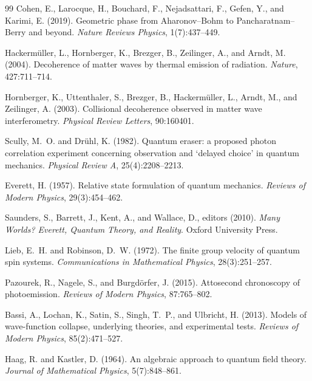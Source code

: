 \documentclass[11pt,a4paper]{article}
\theoremstyle{plain}
\theoremstyle{definition}
\theoremstyle{remark}
\begin{document}
\begin{thebibliography}{99}
Cohen, E., Larocque, H., Bouchard, F., Nejadsattari, F., Gefen, Y., and
  Karimi, E. (2019).
\newblock Geometric phase from Aharonov--Bohm to Pancharatnam--Berry and beyond.
\newblock \emph{Nature Reviews Physics}, 1(7):437--449.

Hackerm\"{u}ller, L., Hornberger, K., Brezger, B., Zeilinger, A., and Arndt, M.
  (2004).
\newblock Decoherence of matter waves by thermal emission of radiation.
\newblock \emph{Nature}, 427:711--714.

Hornberger, K., Uttenthaler, S., Brezger, B., Hackerm\"{u}ller, L., Arndt, M.,
  and Zeilinger, A. (2003).
\newblock Collisional decoherence observed in matter wave interferometry.
\newblock \emph{Physical Review Letters}, 90:160401.

Scully, M.~O. and Dr\"{u}hl, K. (1982).
\newblock Quantum eraser: a proposed photon correlation experiment concerning
  observation and `delayed choice' in quantum mechanics.
\newblock \emph{Physical Review A}, 25(4):2208--2213.

Everett, H. (1957).
\newblock Relative state formulation of quantum mechanics.
\newblock \emph{Reviews of Modern Physics}, 29(3):454--462.

Saunders, S., Barrett, J., Kent, A., and Wallace, D., editors (2010).
\newblock \emph{Many Worlds? Everett, Quantum Theory, and Reality}.
\newblock Oxford University Press.

Lieb, E.~H. and Robinson, D.~W. (1972).
\newblock The finite group velocity of quantum spin systems.
\newblock \emph{Communications in Mathematical Physics}, 28(3):251--257.

Pazourek, R., Nagele, S., and Burgd\"{o}rfer, J. (2015).
\newblock Attosecond chronoscopy of photoemission.
\newblock \emph{Reviews of Modern Physics}, 87:765--802.

Bassi, A., Lochan, K., Satin, S., Singh, T.~P., and Ulbricht, H. (2013).
\newblock Models of wave-function collapse, underlying theories, and experimental
  tests.
\newblock \emph{Reviews of Modern Physics}, 85(2):471--527.

Haag, R. and Kastler, D. (1964).
\newblock An algebraic approach to quantum field theory.
\newblock \emph{Journal of Mathematical Physics}, 5(7):848--861.


\end{thebibliography}
\end{document}
